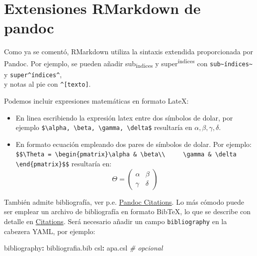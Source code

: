 \documentclass[
]{book}
\newenvironment{Shaded}{\begin{snugshade}}{\end{snugshade}}
\newcommand{\AttributeTok}[1]{\textcolor[rgb]{0.77,0.63,0.00}{#1}}
\newcommand{\CommentTok}[1]{\textcolor[rgb]{0.56,0.35,0.01}{\textit{#1}}}
\newcommand{\FunctionTok}[1]{\textcolor[rgb]{0.00,0.00,0.00}{#1}}
\newcommand{\KeywordTok}[1]{\textcolor[rgb]{0.13,0.29,0.53}{\textbf{#1}}}
\theoremstyle{break}
\theoremstyle{nonumberplain}
\begin{document}
\hypertarget{extensiones-rmarkdown-de-pandoc}{%
\section{Extensiones RMarkdown de pandoc}\label{extensiones-rmarkdown-de-pandoc}}

Como ya se comentó, RMarkdown utiliza la sintaxis extendida proporcionada por Pandoc.
Por ejemplo, se pueden añadir sub\textsubscript{índices} y super\textsuperscript{índices} con \texttt{sub\textasciitilde{}índices\textasciitilde{}} y \texttt{super\^{}índices\^{}},\\
y notas al pie con \texttt{\^{}{[}texto{]}}.

Podemos incluir expresiones matemáticas en formato LateX:

\begin{itemize}
\item
  En linea escribiendo la expresión latex entre dos símbolos de dolar,
  por ejemplo \texttt{\$\textbackslash{}alpha,\ \textbackslash{}beta,\ \textbackslash{}gamma,\ \textbackslash{}delta\$}
  resultaría en \(\alpha, \beta, \gamma, \delta\).
\item
  En formato ecuación empleando dos pares de símbolos de dolar. Por ejemplo:
  \texttt{\$\$\textbackslash{}Theta\ =\ \textbackslash{}begin\{pmatrix\}\textbackslash{}alpha\ \&\ \textbackslash{}beta\textbackslash{}\textbackslash{}\ \ \ \ \ \textbackslash{}gamma\ \&\ \textbackslash{}delta\ \ \ \ \ \textbackslash{}end\{pmatrix\}\$\$}
  resultaría en:
  \[\Theta = \begin{pmatrix}\alpha & \beta\\
  \gamma & \delta
  \end{pmatrix}\]
\end{itemize}

También admite bibliografía, ver p.e. \href{https://pandoc.org/MANUAL.html\#citations}{Pandoc Citations}.
Lo más cómodo puede ser emplear un archivo de bibliografía en formato BibTeX, lo que se describe con detalle en \href{https://bookdown.org/yihui/bookdown/citations.html}{Citations}.
Será necesario añadir un campo \texttt{bibliography} en la cabezera YAML, por ejemplo:

\begin{Shaded}
\begin{Highlighting}[]
\FunctionTok{bibliography}\KeywordTok{:}\AttributeTok{ bibliografia.bib}
\FunctionTok{csl}\KeywordTok{:}\AttributeTok{ apa.csl}\CommentTok{  \# opcional}
\end{Highlighting}
\end{Shaded}
\end{document}
